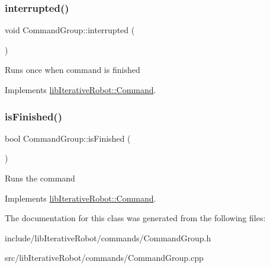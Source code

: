 \subsubsection{\texorpdfstring{interrupted()}{interrupted()}}
{\footnotesize\ttfamily void Command\+Group\+::interrupted (\begin{DoxyParamCaption}{ }\end{DoxyParamCaption})\hspace{0.3cm}{\ttfamily [virtual]}}

Runs once when command is finished 

Implements \mbox{\hyperlink{classlib_iterative_robot_1_1_command_a1c17b601d1b69822cabadb92069d1747}{lib\+Iterative\+Robot\+::\+Command}}.

\mbox{\label{classlib_iterative_robot_1_1_command_group_a96807a2763adf9e21ebf2cb9e3574e3c}} 
\subsubsection{\texorpdfstring{isFinished()}{isFinished()}}
{\footnotesize\ttfamily bool Command\+Group\+::is\+Finished (\begin{DoxyParamCaption}{ }\end{DoxyParamCaption})\hspace{0.3cm}{\ttfamily [virtual]}}

Runs the command 

Implements \mbox{\hyperlink{classlib_iterative_robot_1_1_command_a8e4dccdd88f432a716090f532ba097f7}{lib\+Iterative\+Robot\+::\+Command}}.



The documentation for this class was generated from the following files\+:\begin{DoxyCompactItemize}
\item 
include/lib\+Iterative\+Robot/commands/Command\+Group.\+h\item 
src/lib\+Iterative\+Robot/commands/Command\+Group.\+cpp\end{DoxyCompactItemize}
